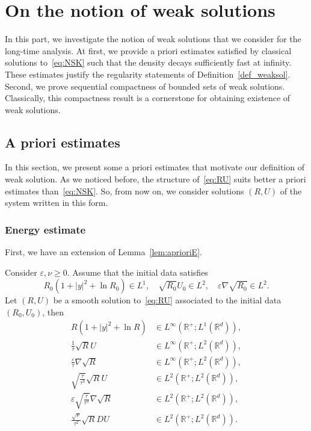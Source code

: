 \documentclass[10pt]{amsart}
\theoremstyle{definition}\newtheorem{defi}[theo]{Definition}\newtheorem{rema}[theo]{Remark}\newtheorem{exam}[theo]{Example}\newtheorem{exem}[theo]{Example}\newtheorem{nota}[theo]{Notation}
\newcommand*\R{\mathbb{R}}
\newcommand*\<{\left\langle}
\renewcommand*\>{\right\rangle}
\renewcommand*\ge{\geqslant}
\newcommand*\eps{\varepsilon}
\begin{document}
\section{On the notion of weak solutions}\label{sec:compactness}

In this part, we investigate the notion of weak solutions that we consider for the long-time analysis. At first, we provide a priori estimates satisfied by classical solutions to~\eqref{eq:NSK} such that the density decays sufficiently fast at infinity. These estimates justify the regularity statements of Definition~\ref{def_weaksol}. Second, we prove sequential compactness of bounded sets of weak solutions. Classically, this compactness result is a cornerstone for obtaining existence of weak solutions.

\subsection{A priori estimates}\label{sec:apriori}

In this section, we present some a priori estimates that motivate our definition of weak solution. As we noticed before, the structure of~\eqref{eq:RU} suits better a priori estimates than~\eqref{eq:NSK}. So, from now on, we consider solutions $(R,U)$ of the system written in this form.

\subsubsection{Energy estimate}

First, we have an extension of Lemma~\ref{lem:aprioriE}.

\begin{prop}\label{prop:apriori-energy}
Consider $\eps, \nu \ge 0$. Assume that the initial data satisfies
\[
R_0(1+|y|^2 + \ln R_0) \in L^1, \quad
\sqrt{R_0} U_0 \in L^2, \quad
\eps \nabla \sqrt{R_0} \in L^2.
\]
Let $(R,U)$ be a smooth solution to~\eqref{eq:RU} associated to the initial data $(R_0,U_0)$, then
\begin{equation}\label{eq:apriori-energy}
\begin{aligned}
R(1+|y|^2 + \ln R) &\in L^\infty(\R^+ ; L^1(\R^d)), \\
\frac{1}{\tau} \sqrt{R} U &\in L^\infty(\R^+ ; L^2 (\R^d)), \\
\frac{\eps}{\tau} \nabla \sqrt{R} &\in L^\infty(\R^+ ; L^2 (\R^d)), \\
\sqrt{\frac{\dot \tau}{\tau^3}} \sqrt R U &\in L^2(\R^+ ; L^2 (\R^d)), \\
\eps \sqrt{\frac{\dot \tau}{\tau^3}} \nabla \sqrt{R} &\in L^2(\R^+ ; L^2 (\R^d)), \\
\frac{\sqrt \nu}{\tau^2} \sqrt{R} DU &\in L^2(\R^+ ; L^2 (\R^d)).
\end{aligned}
\end{equation}
\end{prop}
\end{document}
